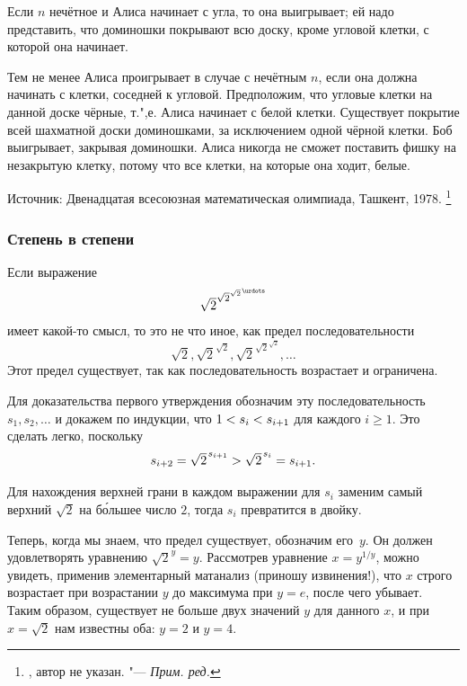 \documentclass[twoside]{book}
\begin{document}
Если $n$ нечётное и Алиса начинает с угла, то она выигрывает;
ей надо представить, что доминошки покрывают всю доску, кроме угловой клетки, с которой она начинает.

Тем не менее Алиса проигрывает в случае с нечётным $n$, если она должна начинать с клетки, соседней к угловой.
Предположим, что угловые клетки на данной доске чёрные, т.",е. Алиса начинает с белой клетки.
Существует покрытие всей шахматной доски доминошками, за исключением одной чёрной клетки.
Боб выигрывает, закрывая доминошки.
Алиса
никогда не сможет поставить фишку на незакрытую клетку, потому что все клетки, на которые она ходит, белые.\heart

\medskip

{\small

Источник: Двенадцатая всесоюзная математическая олимпиада, Ташкент, 1978.%
\footnote{\cite[№262]{ВсМО}, автор не указан. "--- \emph{Прим. ред.}}

}


\subsubsection*{Степень в степени} %

Если выражение
$${\textstyle\sqrt{2}}^{{\sqrt{2}}^{{\sqrt{2}}^{\mkern2mu\urdots}}}$$
имеет какой-то смысл, то это не что иное, как предел последовательности
$${\textstyle\sqrt{2}}, {\textstyle\sqrt{2}}^{{\sqrt{2}}}, {\textstyle\sqrt{2}}^{{\sqrt{2}}^{{\sqrt{2}}}},\dots$$
Этот предел существует, так как последовательность возрастает и ограничена.

Для доказательства первого утверждения обозначим эту последовательность
$s_1, s_2,\dots$ и докажем по индукции, что $1<s_i\z<s_{i+1}$
для каждого $i\ge 1$.
Это сделать легко, поскольку \[s_{i+2}=
{\textstyle\sqrt{2}\mkern2mu}^{s_{i+1}}
>{\textstyle\sqrt{2}\mkern2mu} ^{s_{i}}
=s_{i+1}.\]

Для нахождения верхней грани в каждом выражении для $s_i$ заменим самый верхний $\sqrt{2}$ на б\'{о}льшее число $2$, тогда $s_i$ превратится в двойку.

Теперь, когда мы знаем, что предел существует, обозначим его~$y$.
Он должен удовлетворять уравнению ${\sqrt{2}}^y=y$.
Рассмотрев уравнение $x=y^{1/y}$, 
можно увидеть, применив элементарный матанализ (приношу извинения!), 
что $x$ строго возрастает при возрастании $y$ до максимума при $y=e$, после чего убывает.
Таким образом, существует не больше двух значений $y$ для данного $x$, 
и при $x=\sqrt{2}$ нам известны оба: $y=2$ и $y=4$.
\end{document}
